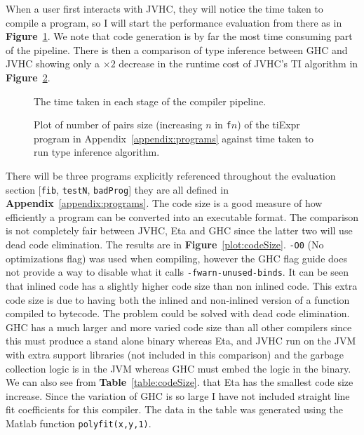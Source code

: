 \documentclass[float=false, crop=false]{standalone}
\newlength\gwidth
\newlength\gheight
\newcommand{\namefig}{\textbf{Figure}~}
\newcommand{\nametable}{\textbf{Table}~}
\newcommand{\importMGraph}[3]{\setlength{\gwidth}{#2}\setlength{\gheight}{#3}{#1}}
\begin{document}
When a user first interacts with JVHC, they will notice the time taken to compile a program, so I will
start the performance evaluation from there as in \namefig\ref{plot:TimeInStages}. We note that code generation is by far the most time consuming part of the pipeline. There is then a comparison 
of type inference between GHC and JVHC showing only a $\times 2$ 
decrease in the runtime cost of JVHC's TI algorithm in 
\namefig\ref{plot:tiTime}.

\begin{samepage}
\begin{figure}[ht]
  \centering
      \importMGraph{plotStage.tex}{0.7\textwidth}{0.25\textwidth}
      \caption[Average time taken for an average program
      at each stage in the compiler]{The time taken in each stage of the compiler pipeline. }
      \label{plot:TimeInStages}
\end{figure}
  \end{samepage}

\begin{figure}
  \begin{samepage}
  \importMGraph{tiTime.tex}{0.93\textwidth}{0.4\textwidth}
  \caption[Type inference runtime as a function of input size]
  {Plot of number of pairs size (increasing $n$ in \texttt{f$n$}) 
    of the tiExpr program in Appendix~\ref{appendix:programs} against time taken 
    to run type inference algorithm.}
  \label{plot:tiTime}
\end{samepage}
\end{figure}

There will be three programs explicitly referenced throughout the evaluation section 
[\texttt{fib}, \texttt{testN}, \texttt{badProg}] they are all defined in 
\textbf{Appendix}~\ref{appendix:programs}.
The code size is a good measure of how efficiently a program can be converted
into an executable format. The comparison is not completely fair
between JVHC, Eta and GHC since the latter two will use dead code 
elimination. The results are in \namefig\ref{plot:codeSize}. \texttt{-O0} (No optimizations flag) 
was used when compiling, however the GHC flag guide \cite{haskell-flag-ref}
does not provide a way to disable what it calls \texttt{-fwarn-unused-binds}.
It can be seen that inlined code has a slightly higher code size than non inlined code.
This extra code size is due to having both the inlined and non-inlined version of a function compiled to
bytecode. The problem could be solved with dead code elimination. GHC has a much larger 
and more varied code size than all other compilers since this must produce a stand alone binary 
whereas Eta, and JVHC run on the JVM with extra support libraries (not included in this comparison) 
and the garbage collection logic is in the JVM whereas GHC must embed the logic in the binary. 
We can also see from \nametable\ref{table:codeSize}. 
that Eta has the smallest code size increase. Since the variation of GHC is so large I have not
included straight line fit coefficients for this compiler. The data in the table
was generated using the Matlab function \verb|polyfit(x,y,1)|.
\end{document}
